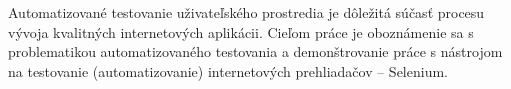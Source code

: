 Automatizované testovanie uživateľského prostredia je dôležitá súčasť procesu vývoja kvalitných internetových aplikácii. Cieľom práce je oboznámenie sa s problematikou automatizovaného testovania a demonštrovanie práce s nástrojom na testovanie (automatizovanie) internetových prehliadačov -- Selenium.